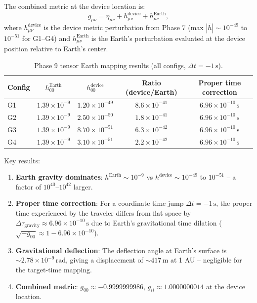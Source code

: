 The combined metric at the device location is:
\begin{equation}
g_{\mu\nu} = \eta_{\mu\nu} + h^{\text{device}}_{\mu\nu} + h^{\text{Earth}}_{\mu\nu},
\end{equation}
where $h^{\text{device}}_{\mu\nu}$ is the device metric perturbation from Phase 7 (max $|\bar{h}| \sim 10^{-49}$ to $10^{-51}$ for G1--G4) and $h^{\text{Earth}}_{\mu\nu}$ is the Earth's perturbation evaluated at the device position relative to Earth's center.

\begin{table}[t]
\centering
\caption{Phase 9 tensor Earth mapping results (all configs, $\Delta t = -1\,\text{s}$).}
\label{tab:phase9-tensor-earth}
\begin{tabular}{lcccc}
\hline
Config & $h^{\text{Earth}}_{00}$ & $h^{\text{device}}_{00}$ & Ratio (device/Earth) & Proper time correction \\
\hline
G1 & $1.39\times 10^{-9}$ & $1.20\times 10^{-49}$ & $8.6\times 10^{-41}$ & $6.96\times 10^{-10}\,\text{s}$ \\
G2 & $1.39\times 10^{-9}$ & $2.50\times 10^{-50}$ & $1.8\times 10^{-41}$ & $6.96\times 10^{-10}\,\text{s}$ \\
G3 & $1.39\times 10^{-9}$ & $8.70\times 10^{-51}$ & $6.3\times 10^{-42}$ & $6.96\times 10^{-10}\,\text{s}$ \\
G4 & $1.39\times 10^{-9}$ & $3.10\times 10^{-51}$ & $2.2\times 10^{-42}$ & $6.96\times 10^{-10}\,\text{s}$ \\
\hline
\end{tabular}
\end{table}

Key results:
\begin{enumerate}
    \item \textbf{Earth gravity dominates}: $h^{\text{Earth}} \sim 10^{-9}$ vs $h^{\text{device}} \sim 10^{-49}$ to $10^{-51}$ -- a factor of $10^{40}$--$10^{42}$ larger.
    \item \textbf{Proper time correction}: For a coordinate time jump $\Delta t = -1\,\text{s}$, the proper time experienced by the traveler differs from flat space by $\Delta\tau_{\text{gravity}} \approx 6.96\times 10^{-10}\,\text{s}$ due to Earth's gravitational time dilation ($\sqrt{-g_{00}} \approx 1 - 6.96\times 10^{-10}$).
    \item \textbf{Gravitational deflection}: The deflection angle at Earth's surface is $\sim 2.78\times 10^{-9}\,\text{rad}$, giving a displacement of $\sim 417\,\text{m}$ at 1 AU -- negligible for the target-time mapping.
    \item \textbf{Combined metric}: $g_{00} \approx -0.9999999986$, $g_{ii} \approx 1.0000000014$ at the device location.
\end{enumerate}

